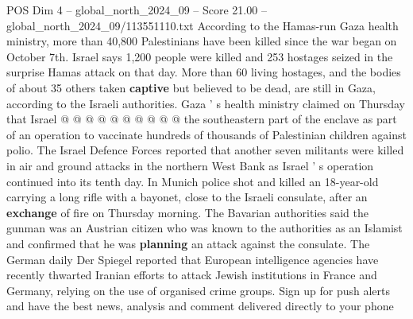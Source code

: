 \begin{textsample}{POS Dim 4 – global\_north\_2024\_09 – Score 21.00 – global\_north\_2024\_09/113551110.txt}
According to the Hamas-run Gaza health ministry, more than 40,800 Palestinians have been killed since the war began on October 7th.
Israel says 1,200 people were killed and 253 hostages seized in the surprise Hamas attack on that day.
More than 60 living hostages, and the bodies of about 35 others taken \textbf{captive} but believed to be dead, are still in Gaza, according to the Israeli authorities.
Gaza ' s health ministry claimed on Thursday that Israel @ @ @ @ @ @ @ @ @ @ the southeastern part of the enclave as part of an operation to vaccinate hundreds of thousands of Palestinian children against polio.
The Israel Defence Forces reported that another seven militants were killed in air and ground attacks in the northern West Bank as Israel ' s operation continued into its tenth day.
In Munich police shot and killed an 18-year-old carrying a long rifle with a bayonet, close to the Israeli consulate, after an \textbf{exchange} of fire on Thursday morning.
The Bavarian authorities said the gunman was an Austrian citizen who was known to the authorities as an Islamist and confirmed that he was \textbf{planning} an attack against the consulate.
The German daily Der Spiegel reported that European intelligence agencies have recently thwarted Iranian efforts to attack Jewish institutions in France and Germany, relying on the use of organised crime groups.
Sign up for push alerts and have the best news, analysis and comment delivered directly to your phone

\end{textsample}
